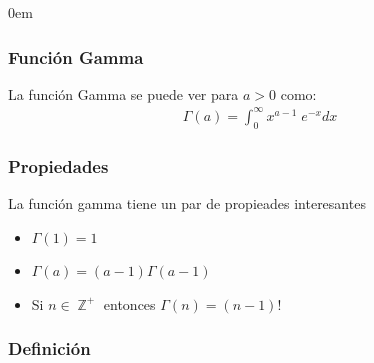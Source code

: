 \documentclass[12pt, fleqn]{report}                             %
\newenvironment{SmallIndentation}[1][0.75em]                    %
        {\begin{adjustwidth}{#1}{}\begin{footnotesize}}             %
        {\end{footnotesize}\end{adjustwidth}}                       %
\theoremstyle{break}                                            %
\DeclareMathOperator \Integers     {\mathbb{Z}}                 %
\begin{document}
                \begin{multicols}{2}
                \begin{SmallIndentation}[0em]

                    \subsubsection{Función Gamma}

                        La función Gamma se puede ver para $a > 0$ como:
                        \begin{align*}
                            \Gamma(a) = \int_0^\infty x^{a - 1} \; e^{-x} dx
                        \end{align*}

                        \subsubsection{Propiedades}

                            La función gamma tiene un par de propieades interesantes
                            \begin{itemize}
                                \item $\Gamma(1) = 1$
                                \item $\Gamma(a) = (a - 1)\Gamma(a - 1)$
                                \item Si $n \in \Integers^+$ entonces $\Gamma(n) = (n-1)!$
                            \end{itemize}


                    \subsubsection{Definición}


\end{SmallIndentation}
\end{multicols}
\end{document}

